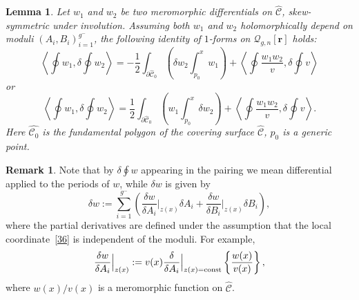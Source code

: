 \documentclass[pdftex]{sigma}
\numberwithin{equation}{section}
\newtheorem{Lemma}[Theorem]{Lemma}
\theoremstyle{definition}
\newtheorem{Remark}[Theorem]{Remark}
\begin{document}
\begin{Lemma} \label{Lem_1}
Let $w_1$ and $w_2$ be two meromorphic differentials on $\hat{\mathcal{C}}$, skew-symmetric under involution. Assuming both $w_1$ and $w_2$ holomorphically depend on moduli $(A_i, B_i)^{g^-}_{i=1}$, the following identity of $1$-forms on $\mathcal{Q}_{g,n}[\textbf{r}]$ holds:
\begin{equation}\label{78}\left\langle \oint w_1, \delta \oint w_2\right\rangle =-\frac{1}{2}\int_{\partial \hat{\mathcal{C}}_0}\left(\delta w_2
\int^x_{p_0} w_1\right)+\left\langle \oint \frac{w_1 w_2}{v},\delta \oint v\right\rangle \end{equation} or
\begin{equation}\label{79}\left\langle \oint w_1, \delta \oint w_2\right\rangle =\frac{1}{2}\int_{\partial \hat{\mathcal{C}}_0}\left( w_1
\int^x_{p_0} \delta w_2\right)+\left\langle \oint\frac{w_1 w_2}{v},\delta \oint v\right\rangle. \end{equation}
Here $\hat{\mathcal{C}_0}$ is the fundamental polygon of the covering surface $\hat{\mathcal{C}}$, $p_0$ is a generic point.
\end{Lemma}
\begin{Remark}
Note that by $\delta \oint w$ appearing in the pairing we mean differential applied to the periods of $w$, while $\delta w$ is given by
\begin{equation}\label{80}\delta w:=\sum^{g^-}_{i=1} \left(\frac{\delta w}{\delta A_i}\Big|_{z(x)} \delta A_i +\frac{\delta w}{\delta B_i}\Big|_{z(x)} \delta B_i\right),\end{equation}
where the partial derivatives are defined under the assumption that the local coordinate~\eqref{36} is independent of the moduli. For example,
\begin{equation*}\frac{\delta w}{\delta A_i}\Big|_{z(x)}:=
v(x) \frac{\delta}{\delta A_i}\Big|_{z(x)={\rm const}}\left\{\frac{w(x)}{v(x)}\right\}, \end{equation*}
where $w(x)/v(x)$ is
a meromorphic function on $\hat{\mathcal{C}}$.
\end{Remark}
\end{document}
